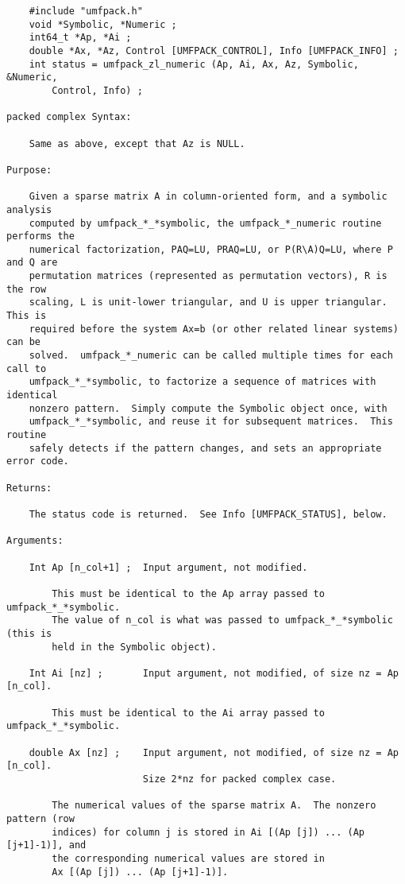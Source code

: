 \documentclass[11pt]{article}
\begin{document}
{\begin{verbatim}
    #include "umfpack.h"
    void *Symbolic, *Numeric ;
    int64_t *Ap, *Ai ;
    double *Ax, *Az, Control [UMFPACK_CONTROL], Info [UMFPACK_INFO] ;
    int status = umfpack_zl_numeric (Ap, Ai, Ax, Az, Symbolic, &Numeric,
        Control, Info) ;

packed complex Syntax:

    Same as above, except that Az is NULL.

Purpose:

    Given a sparse matrix A in column-oriented form, and a symbolic analysis
    computed by umfpack_*_*symbolic, the umfpack_*_numeric routine performs the
    numerical factorization, PAQ=LU, PRAQ=LU, or P(R\A)Q=LU, where P and Q are
    permutation matrices (represented as permutation vectors), R is the row
    scaling, L is unit-lower triangular, and U is upper triangular.  This is
    required before the system Ax=b (or other related linear systems) can be
    solved.  umfpack_*_numeric can be called multiple times for each call to
    umfpack_*_*symbolic, to factorize a sequence of matrices with identical
    nonzero pattern.  Simply compute the Symbolic object once, with
    umfpack_*_*symbolic, and reuse it for subsequent matrices.  This routine
    safely detects if the pattern changes, and sets an appropriate error code.

Returns:

    The status code is returned.  See Info [UMFPACK_STATUS], below.

Arguments:

    Int Ap [n_col+1] ;  Input argument, not modified.

        This must be identical to the Ap array passed to umfpack_*_*symbolic.
        The value of n_col is what was passed to umfpack_*_*symbolic (this is
        held in the Symbolic object).

    Int Ai [nz] ;       Input argument, not modified, of size nz = Ap [n_col].

        This must be identical to the Ai array passed to umfpack_*_*symbolic.

    double Ax [nz] ;    Input argument, not modified, of size nz = Ap [n_col].
                        Size 2*nz for packed complex case.

        The numerical values of the sparse matrix A.  The nonzero pattern (row
        indices) for column j is stored in Ai [(Ap [j]) ... (Ap [j+1]-1)], and
        the corresponding numerical values are stored in
        Ax [(Ap [j]) ... (Ap [j+1]-1)].


\end{verbatim}}
\end{document}
